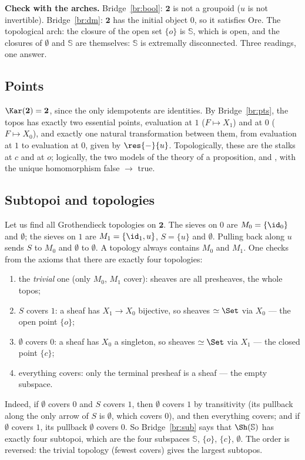\textbf{Check with the arches.} Bridge~\ref{br:bool}: $\mathbf 2$ is not a groupoid ($u$ is not invertible). Bridge~\ref{br:dm}: $\mathbf 2$ has the initial object $0$, so it satisfies Ore. The topological arch: the closure of the open set $\{o\}$ is $\mathbb S$, which is open, and the closures of $\emptyset$ and $\mathbb S$ are themselves: $\mathbb S$ is extremally disconnected. Three readings, one answer.

\subsection{Points}

$\Kar(\mathbf 2) = \mathbf 2$, since the only idempotents are identities. By Bridge~\ref{br:pts}, the topos has exactly two essential points, evaluation at $1$ ($F\mapsto X_1$) and at $0$ ($F\mapsto X_0$), and exactly one natural transformation between them, from evaluation at $1$ to evaluation at $0$, given by $\res{-}{u}$. Topologically, these are the stalks at $c$ and at $o$; logically, the two models of the theory of a proposition,  and , with the unique homomorphism false $\to$ true.

\subsection{Subtopoi and topologies}

Let us find all Grothendieck topologies on $\mathbf 2$. The sieves on $0$ are $M_0 = \{\id_0\}$ and $\emptyset$; the sieves on $1$ are $M_1 = \{\id_1,u\}$, $S = \{u\}$ and $\emptyset$. Pulling back along $u$ sends $S$ to $M_0$ and $\emptyset$ to $\emptyset$. A topology always contains $M_0$ and $M_1$. One checks from the axioms that there are exactly four topologies:
\begin{enumerate}
\item the \emph{trivial} one (only $M_0$, $M_1$ cover): sheaves are all presheaves, the whole topos;
\item $S$ covers $1$: a sheaf has $X_1\to X_0$ bijective, so sheaves $\simeq\Set$ via $X_0$ --- the open point $\{o\}$;
\item $\emptyset$ covers $0$: a sheaf has $X_0$ a singleton, so sheaves $\simeq\Set$ via $X_1$ --- the closed point $\{c\}$;
\item everything covers: only the terminal presheaf is a sheaf --- the empty subspace.
\end{enumerate}
Indeed, if $\emptyset$ covers $0$ and $S$ covers $1$, then $\emptyset$ covers $1$ by transitivity (its pullback along the only arrow of $S$ is $\emptyset$, which covers $0$), and then everything covers; and if $\emptyset$ covers $1$, its pullback $\emptyset$ covers $0$. So Bridge~\ref{br:sub} says that $\Sh(\mathbb S)$ has exactly four subtopoi, which are the four subspaces $\mathbb S$, $\{o\}$, $\{c\}$, $\emptyset$. The order is reversed: the trivial topology (fewest covers) gives the largest subtopos.

